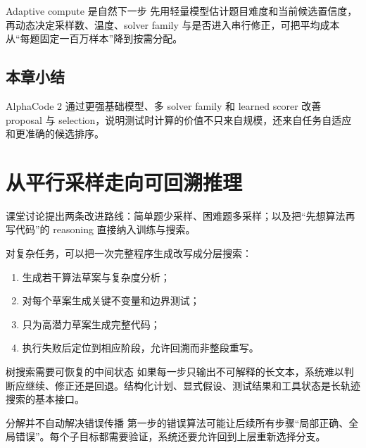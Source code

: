 \documentclass[a4paper]{article}
\begin{document}


\begin{knowledgebox}{Adaptive compute 是自然下一步}
先用轻量模型估计题目难度和当前候选置信度，再动态决定采样数、温度、solver family 与是否进入串行修正，可把平均成本从“每题固定一百万样本”降到按需分配。
\end{knowledgebox}

\subsection{本章小结}

AlphaCode 2 通过更强基础模型、多 solver family 和 learned scorer 改善 proposal 与 selection，说明测试时计算的价值不只来自规模，还来自任务自适应和更准确的候选排序。

\section{从平行采样走向可回溯推理}

课堂讨论提出两条改进路线：简单题少采样、困难题多采样；以及把“先想算法再写代码”的 reasoning 直接纳入训练与搜索。

对复杂任务，可以把一次完整程序生成改写成分层搜索：

\begin{enumerate}
    \item 生成若干算法草案与复杂度分析；
    \item 对每个草案生成关键不变量和边界测试；
    \item 只为高潜力草案生成完整代码；
    \item 执行失败后定位到相应阶段，允许回溯而非整段重写。
\end{enumerate}

\begin{importantbox}{树搜索需要可恢复的中间状态}
如果每一步只输出不可解释的长文本，系统难以判断应继续、修正还是回退。结构化计划、显式假设、测试结果和工具状态是长轨迹搜索的基本接口。
\end{importantbox}

\begin{warningbox}{分解并不自动解决错误传播}
第一步的错误算法可能让后续所有步骤“局部正确、全局错误”。每个子目标都需要验证，系统还要允许回到上层重新选择分支。
\end{warningbox}
\end{document}
